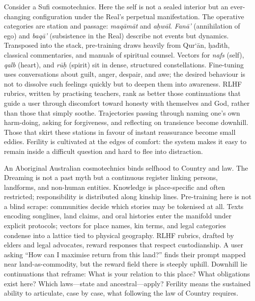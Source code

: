\documentclass[12pt,a4paper]{article}
\begin{document}
Consider a Sufi cosmotechnics.\cite{IbnArabi,Hui2016} Here the self is not a sealed interior but an ever-changing configuration under the Real's perpetual manifestation. The operative categories are station and passage: \emph{maq\={a}m\={a}t} and \emph{a\d{h}w\={a}l}. \emph{Fan\={a}'} (annihilation of ego) and \emph{baq\={a}'} (subsistence in the Real) describe not events but dynamics. Transposed into the stack, pre-training draws heavily from Qur\textquoteleft\=an, \d{h}ad\={\i}th, classical commentaries, and manuals of spiritual counsel. Vectors for \emph{nafs} (self), \emph{qalb} (heart), and \emph{r\={u}\d{h}} (spirit) sit in dense, structured constellations. Fine-tuning uses conversations about guilt, anger, despair, and awe; the desired behaviour is not to dissolve such feelings quickly but to deepen them into awareness. RLHF rubrics, written by practising teachers, rank as better those continuations that guide a user through discomfort toward honesty with themselves and God, rather than those that simply soothe. Trajectories passing through naming one's own harm-doing, asking for forgiveness, and reflecting on transience become downhill. Those that skirt these stations in favour of instant reassurance become small eddies. Ferility is cultivated at the edges of comfort: the system makes it easy to remain inside a difficult question and hard to flee into distraction.

An Aboriginal Australian cosmotechnics binds selfhood to Country and law.\cite{Hui2016} The Dreaming is not a past myth but a continuous register linking persons, landforms, and non-human entities. Knowledge is place-specific and often restricted; responsibility is distributed along kinship lines. Pre-training here is not a blind scrape: communities decide which stories may be tokenised at all. Texts encoding songlines, land claims, and oral histories enter the manifold under explicit protocols; vectors for place names, kin terms, and legal categories condense into a lattice tied to physical geography. RLHF rubrics, drafted by elders and legal advocates, reward responses that respect custodianship. A user asking ``How can I maximise return from this land?'' finds their prompt mapped near land-as-commodity, but the reward field there is steeply uphill. Downhill lie continuations that reframe: What is your relation to this place? What obligations exist here? Which laws---state and ancestral---apply? Ferility means the sustained ability to articulate, case by case, what following the law of Country requires.
\end{document}
